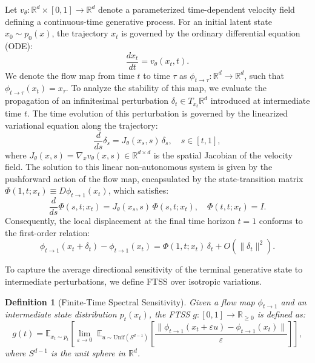 \documentclass[11pt]{article}
\newtheorem{definition}[theorem]{Definition}
\begin{document}
Let $v_\theta: \mathbb{R}^d \times [0,1] \to \mathbb{R}^d$ denote a parameterized time-dependent velocity field defining a continuous-time generative process. For an initial latent state $x_0 \sim p_0(x)$, the trajectory $x_t$ is governed by the ordinary differential equation (ODE):
\begin{equation}
\frac{dx_t}{dt} = v_\theta(x_t, t).
\end{equation}
We denote the flow map from time $t$ to time $\tau$ as $\phi_{t\to\tau}: \mathbb{R}^d \to \mathbb{R}^d$, such that $\phi_{t\to\tau}(x_t) = x_\tau$. To analyze the stability of this map, we evaluate the propagation of an infinitesimal perturbation $\delta_t \in T_{x_t}\mathbb{R}^d$ introduced at intermediate time $t$. The time evolution of this perturbation is governed by the linearized variational equation along the trajectory:
\begin{equation}
\frac{d}{ds}\delta_s = J_\theta(x_s, s)\,\delta_s, \quad s \in [t,1],
\end{equation}
where $J_\theta(x,s) = \nabla_x v_\theta(x,s) \in \mathbb{R}^{d \times d}$ is the spatial Jacobian of the velocity field. The solution to this linear non-autonomous system is given by the pushforward action of the flow map, encapsulated by the state-transition matrix $\Phi(1,t; x_t) \equiv D\phi_{t\to 1}(x_t)$, which satisfies:
\begin{equation}
\frac{d}{ds}\Phi(s,t; x_t) = J_\theta(x_s,s)\,\Phi(s,t; x_t), \quad \Phi(t,t; x_t) = I.
\end{equation}
Consequently, the local displacement at the final time horizon $t=1$ conforms to the first-order relation:
\begin{equation}\label{eq:var}
\phi_{t\to 1}(x_t + \delta_t) - \phi_{t\to 1}(x_t) = \Phi(1,t; x_t)\,\delta_t + O(\|\delta_t\|^2).
\end{equation}

To capture the average directional sensitivity of the terminal generative state to intermediate perturbations, we define FTSS over isotropic variations.

\begin{definition}[Finite-Time Spectral Sensitivity]
\label{def:ftss}
Given a flow map $\phi_{t\to 1}$ and an intermediate state distribution $p_t(x_t)$, the FTSS $g: [0,1] \to \mathbb{R}_{\ge 0}$ is defined as:
\begin{equation}
g(t) = \mathbb{E}_{x_t \sim p_t}\left[\lim_{\varepsilon \to 0}\; \mathbb{E}_{u \sim \mathrm{Unif}(S^{d-1})}\left[ \frac{\|\phi_{t\to 1}(x_t + \varepsilon u) - \phi_{t\to 1}(x_t)\|}{\varepsilon} \right]\right],
\end{equation}
where $S^{d-1}$ is the unit sphere in $\mathbb{R}^d$.
\end{definition}
\end{document}

